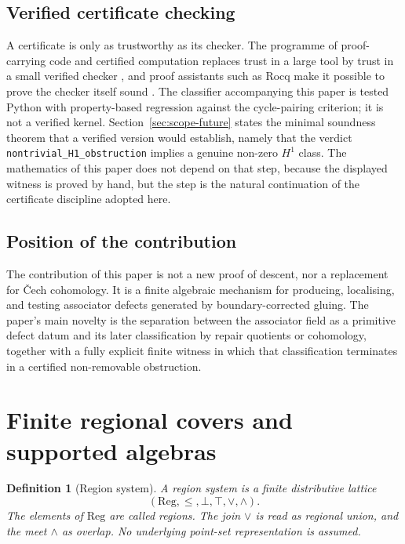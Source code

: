 \documentclass[11pt]{article}
\newtheorem{definition}[theorem]{Definition}
\newcommand{\Reg}{\mathrm{Reg}}
\begin{document}
\subsection{Verified certificate checking}

A certificate is only as trustworthy as its checker. The programme of proof-carrying code and certified computation replaces trust in a large tool by trust in a small verified checker \cite{Necula1997}, and proof assistants such as Rocq make it possible to prove the checker itself sound \cite{Rocq2025}. The classifier accompanying this paper is tested Python with property-based regression against the cycle-pairing criterion; it is not a verified kernel. Section~\ref{sec:scope-future} states the minimal soundness theorem that a verified version would establish, namely that the verdict \texttt{nontrivial\_H1\_obstruction} implies a genuine non-zero \(H^1\) class. The mathematics of this paper does not depend on that step, because the displayed witness is proved by hand, but the step is the natural continuation of the certificate discipline adopted here.

\subsection{Position of the contribution}

The contribution of this paper is not a new proof of descent, nor a replacement for \v{C}ech cohomology. It is a finite algebraic mechanism for producing, localising, and testing associator defects generated by boundary-corrected gluing. The paper's main novelty is the separation between the associator field as a primitive defect datum and its later classification by repair quotients or cohomology, together with a fully explicit finite witness in which that classification terminates in a certified non-removable obstruction.

\section{Finite regional covers and supported algebras}
\label{sec:regions}

\begin{definition}[Region system]
A region system is a finite distributive lattice
\[
(\Reg,\leq,\bot,\top,\vee,\wedge).
\]
The elements of \(\Reg\) are called regions. The join \(\vee\) is read as regional union, and the meet \(\wedge\) as overlap. No underlying point-set representation is assumed.
\end{definition}
\end{document}
